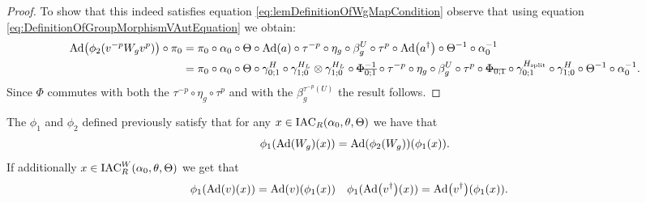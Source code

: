 \documentclass[12pt,a4paper,twoside]{article}
\numberwithin{equation}{section}
\begin{document}
\begin{proof}
	To show that this indeed satisfies equation \eqref{eq:lemDefinitionOfWgMapCondition} observe that using equation \eqref{eq:DefinitionOfGroupMorphismVAutEquation} we obtain:
	\begin{align}
		\Ad{\phi_2(v^{-p}W_g v^{p})}\circ\pi_0&=\pi_0\circ \alpha_0\circ\Theta\circ\Ad{a}\circ\tau^{-p}\circ\eta_g\circ\beta_g^U\circ\tau^p\circ\Ad{a^{\dagger}}\circ\Theta^{-1}\circ\alpha_0^{-1}\\
		&=\pi_0\circ \alpha_0\circ\Theta\circ\gamma^H_{0;1}\circ\gamma^{H_L}_{1;0}\otimes\gamma^{H_L}_{1;0}\circ\stkout{\Phi_{0;1}^{-1}}\circ\tau^{-p}\circ\eta_g\circ\beta_g^U\circ\tau^p\circ\stkout{\Phi_{0;1}}\circ\gamma^{H_\text{split}}_{0;1}\circ\gamma^H_{1;0}\circ\Theta^{-1}\circ\alpha_0^{-1}.
	\end{align}
	Since $\Phi$ commutes with both the $\tau^{-p}\circ\eta_g\circ\tau^p$ and with the $\beta_g^{\tau^{-p}(U)}$ the result follows.
\end{proof}
\begin{lemma}\label{lem:phi1phi2matchingCondition}
	The $\phi_1$ and $\phi_2$ defined previously satisfy that for any $x\in\textrm{IAC}_R(\alpha_0,\theta,\Theta)$ we have that
	\begin{equation}
		\phi_1(\Ad{W_g}(x))=\Ad{\phi_2(W_g)}(\phi_1(x)).
	\end{equation}
	If additionally $x\in\textrm{IAC}_R^W(\alpha_0,\theta,\Theta)$ we get that
	\begin{align}
		\phi_1(\Ad{v}(x))&=\Ad{v}(\phi_1(x))&\phi_1(\Ad{v^\dagger}(x))&=\Ad{v^\dagger}(\phi_1(x)).
	\end{align}
\end{lemma}
\end{document}
